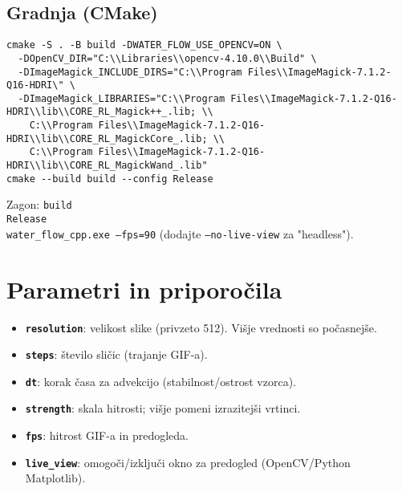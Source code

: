 \documentclass[11pt,a4paper]{article}
\begin{document}
\subsection*{Gradnja (CMake)}
\begin{verbatim}
cmake -S . -B build -DWATER_FLOW_USE_OPENCV=ON \
  -DOpenCV_DIR="C:\\Libraries\\opencv-4.10.0\\Build" \
  -DImageMagick_INCLUDE_DIRS="C:\\Program Files\\ImageMagick-7.1.2-Q16-HDRI\" \
  -DImageMagick_LIBRARIES="C:\\Program Files\\ImageMagick-7.1.2-Q16-HDRI\\lib\\CORE_RL_Magick++_.lib; \\
    C:\\Program Files\\ImageMagick-7.1.2-Q16-HDRI\\lib\\CORE_RL_MagickCore_.lib; \\
    C:\\Program Files\\ImageMagick-7.1.2-Q16-HDRI\\lib\\CORE_RL_MagickWand_.lib"
cmake --build build --config Release
\end{verbatim}
Zagon: \texttt{build\\Release\\water\_flow\_cpp.exe --fps=90} (dodajte \texttt{--no-live-view} za "headless").

\section{Parametri in priporočila}
\begin{itemize}[noitemsep]
  \item \textbf{\texttt{resolution}}: velikost slike (privzeto 512). Višje vrednosti so počasnejše.
  \item \textbf{\texttt{steps}}: število sličic (trajanje GIF-a).
  \item \textbf{\texttt{dt}}: korak časa za advekcijo (stabilnost/ostrost vzorca).
  \item \textbf{\texttt{strength}}: skala hitrosti; višje pomeni izrazitejši vrtinci.
  \item \textbf{\texttt{fps}}: hitrost GIF-a in predogleda.
  \item \textbf{\texttt{live\_view}}: omogoči/izključi okno za predogled (OpenCV/Python Matplotlib).
\end{itemize}
\end{document}
